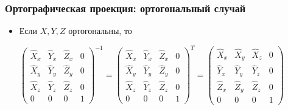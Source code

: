 \documentclass{beamer}
\begin{document}
\begin{frame}[fragile]
\frametitle{Ортографическая проекция: ортогональный случай}
\begin{itemize}
\item Если \begin{math}X, Y, Z\end{math} ортогональны, то 
\begin{center}
\begin{math}
\begin{pmatrix}
\hat X_x & \hat Y_x & \hat Z_x & 0 \\
\hat X_y & \hat Y_y & \hat Z_y & 0 \\
\hat X_z & \hat Y_z & \hat Z_z & 0 \\
0 & 0 & 0 & 1
\end{pmatrix}^{-1}
=
\begin{pmatrix}
\hat X_x & \hat Y_x & \hat Z_x & 0 \\
\hat X_y & \hat Y_y & \hat Z_y & 0 \\
\hat X_z & \hat Y_z & \hat Z_z & 0 \\
0 & 0 & 0 & 1
\end{pmatrix}^T
=
\begin{pmatrix}
\hat X_x & \hat X_y & \hat X_z & 0 \\
\hat Y_x & \hat Y_y & \hat Y_z & 0 \\
\hat Z_x & \hat Z_y & \hat Z_z & 0 \\
0 & 0 & 0 & 1
\end{pmatrix}
\end{math}
\end{center}
\end{itemize}
\end{frame}
\end{document}
